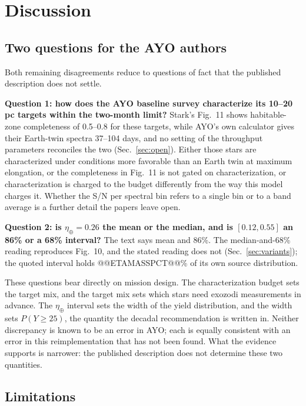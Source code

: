 \documentclass[11pt,a4paper]{article}
\begin{document}
\section{Discussion}
\label{sec:discussion}

\subsection{Two questions for the AYO authors}

Both remaining disagreements reduce to questions of fact that the published description does not
settle.

\textbf{Question 1: how does the AYO baseline survey characterize its 10--20\,pc targets within
the two-month limit?} Stark's Fig.~11 shows habitable-zone completeness of 0.5--0.8 for these
targets, while AYO's own calculator gives their Earth-twin spectra 37--104 days, and no setting of
the throughput parameters reconciles the two (Sec.~\ref{sec:open}). Either those stars are
characterized under conditions more favorable than an Earth twin at maximum elongation, or the
completeness in Fig.~11 is not gated on characterization, or characterization is charged to the
budget differently from the way this model charges it. Whether the S/N per spectral bin refers to
a single bin or to a band average is a further detail the papers leave open.

\textbf{Question 2: is $\eta_\oplus = 0.26$ the mean or the median, and is $[0.12, 0.55]$ an 86\%
or a 68\% interval?} The text says mean and 86\%. The median-and-68\% reading reproduces Fig.~10,
and the stated reading does not (Sec.~\ref{sec:variants}); the quoted interval holds
@@ETAMASSPCT@@\% of its own source distribution.

These questions bear directly on mission design. The characterization budget sets the target mix,
and the target mix sets which stars need exozodi measurements in advance. The $\eta_\oplus$
interval sets the width of the yield distribution, and the width sets $P(Y \ge 25)$, the quantity
the decadal recommendation is written in. Neither discrepancy is known to be an error in AYO; each
is equally consistent with an error in this reimplementation that has not been found. What the
evidence supports is narrower: the published description does not determine these two quantities.

\subsection{Limitations}
\end{document}
